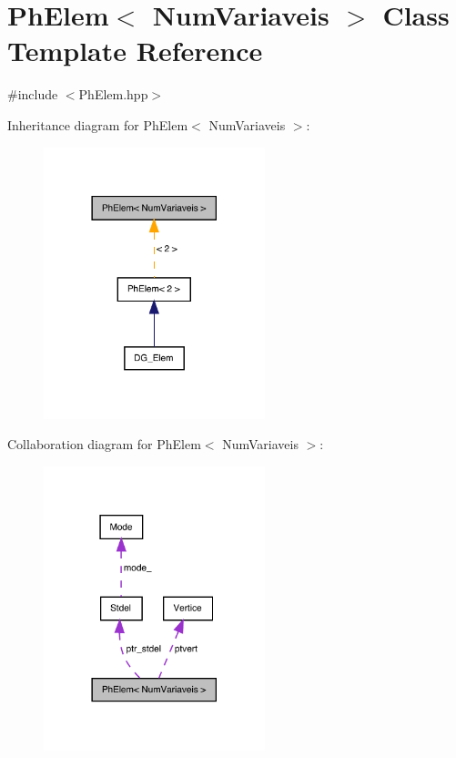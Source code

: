 \hypertarget{classPhElem}{}\section{Ph\+Elem$<$ Num\+Variaveis $>$ Class Template Reference}
\label{classPhElem}


{\ttfamily \#include $<$Ph\+Elem.\+hpp$>$}



Inheritance diagram for Ph\+Elem$<$ Num\+Variaveis $>$\+:
\nopagebreak
\begin{figure}[H]
\begin{center}
\leavevmode
\includegraphics[width=182pt]{classPhElem__inherit__graph}
\end{center}
\end{figure}


Collaboration diagram for Ph\+Elem$<$ Num\+Variaveis $>$\+:
\nopagebreak
\begin{figure}[H]
\begin{center}
\leavevmode
\includegraphics[width=182pt]{classPhElem__coll__graph}
\end{center}
\end{figure}
